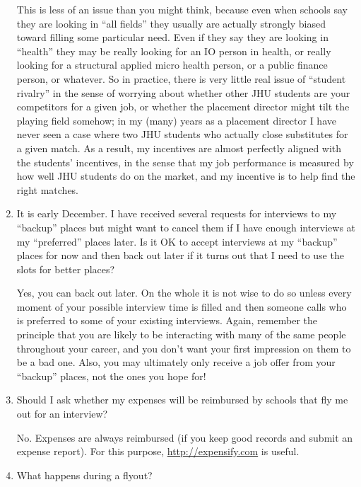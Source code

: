 \documentclass{econtex}
\begin{document}
\begin{enumerate}
  This is less of an issue than you might think, because even when
  schools say they are looking in ``all fields'' they usually are
  actually strongly biased toward filling some particular need.  Even
  if they say they are looking in ``health'' they may be really
  looking for an IO person in health, or really looking for a
  structural applied micro health person, or a public finance person, or
  whatever.  So in practice, there is very little real issue of
  ``student rivalry'' in the sense of worrying about whether other JHU
  students are your competitors for a given job, or whether the
  placement director might tilt the playing field somehow; in my (many) years
  as a placement director I have never seen a case where 
  two JHU students who actually close substitutes for a given match.  As a result, my
  incentives are almost perfectly aligned with the students'
  incentives, in the sense that my job performance is measured by how
  well JHU students do on the market, and my incentive is to help find the right matches.

\item It is early December.  I have received several requests for interviews to my ``backup'' places but might want to cancel them if I have enough interviews at my ``preferred'' places later.  Is it OK to accept interviews at my ``backup'' places for now and then back out later if it turns out that I need to use the slots for better places?

Yes, you can back out later.  On the whole it is not wise to do so unless every moment of your possible interview time is filled and then someone calls who is preferred to some of your existing interviews.  Again, remember the principle that you are likely to be interacting with many of the same people throughout your career, and you don't want your first impression on them to be a bad one.  Also, you may ultimately only receive a job offer from your ``backup'' places, not the ones you hope for!


\item Should I ask whether my expenses will be reimbursed by schools that fly me out for an interview?

No.  Expenses are always reimbursed (if you keep good records and submit an expense report).  For this purpose, \url{http://expensify.com} is useful.

\item What happens during a flyout?


\end{enumerate}
\end{document}
